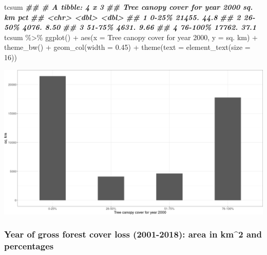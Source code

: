 \documentclass[10pt,landscape,a3paper]{article}
\newenvironment{Shaded}{\begin{snugshade}}{\end{snugshade}}
\newcommand{\AttributeTok}[1]{\textcolor[rgb]{0.77,0.63,0.00}{#1}}
\newcommand{\DecValTok}[1]{\textcolor[rgb]{0.00,0.00,0.81}{#1}}
\newcommand{\DocumentationTok}[1]{\textcolor[rgb]{0.56,0.35,0.01}{\textbf{\textit{#1}}}}
\newcommand{\FloatTok}[1]{\textcolor[rgb]{0.00,0.00,0.81}{#1}}
\newcommand{\FunctionTok}[1]{\textcolor[rgb]{0.00,0.00,0.00}{#1}}
\newcommand{\NormalTok}[1]{#1}
\newcommand{\SpecialCharTok}[1]{\textcolor[rgb]{0.00,0.00,0.00}{#1}}
\newcommand{\StringTok}[1]{\textcolor[rgb]{0.31,0.60,0.02}{#1}}
\begin{document}
\begin{Shaded}
\begin{Highlighting}[]
\NormalTok{tcsum}
\DocumentationTok{\#\# \# A tibble: 4 x 3}
\DocumentationTok{\#\#   \textasciigrave{}Tree canopy cover for year 2000\textasciigrave{} \textasciigrave{}sq. km\textasciigrave{}   pct}
\DocumentationTok{\#\#   \textless{}chr\textgreater{}                                \textless{}dbl\textgreater{} \textless{}dbl\textgreater{}}
\DocumentationTok{\#\# 1 0{-}25\%                               21455. 44.8 }
\DocumentationTok{\#\# 2 26{-}50\%                               4076.  8.50}
\DocumentationTok{\#\# 3 51{-}75\%                               4631.  9.66}
\DocumentationTok{\#\# 4 76{-}100\%                             17762. 37.1}
\NormalTok{tcsum }\SpecialCharTok{\%\textgreater{}\%}
  \FunctionTok{ggplot}\NormalTok{() }\SpecialCharTok{+} \FunctionTok{aes}\NormalTok{(}\AttributeTok{x =} \StringTok{\textasciigrave{}}\AttributeTok{Tree canopy cover for year 2000}\StringTok{\textasciigrave{}}\NormalTok{, }\AttributeTok{y =} \StringTok{\textasciigrave{}}\AttributeTok{sq. km}\StringTok{\textasciigrave{}}\NormalTok{) }\SpecialCharTok{+}
  \FunctionTok{theme\_bw}\NormalTok{() }\SpecialCharTok{+} \FunctionTok{geom\_col}\NormalTok{(}\AttributeTok{width =} \FloatTok{0.45}\NormalTok{) }\SpecialCharTok{+} \FunctionTok{theme}\NormalTok{(}\AttributeTok{text =} \FunctionTok{element\_text}\NormalTok{(}\AttributeTok{size =} \DecValTok{16}\NormalTok{))}
\end{Highlighting}
\end{Shaded}

\begin{center}\includegraphics[width=0.5\linewidth]{img/tree-canopy-cover-2000-nationwide-by-year-1} \end{center}

\hypertarget{year-of-gross-forest-cover-loss-2001-2018-area-in-km2-and-percentages}{%
\subsubsection{Year of gross forest cover loss (2001-2018): area in
km\^{}2 and
percentages}\label{year-of-gross-forest-cover-loss-2001-2018-area-in-km2-and-percentages}}
\end{document}
